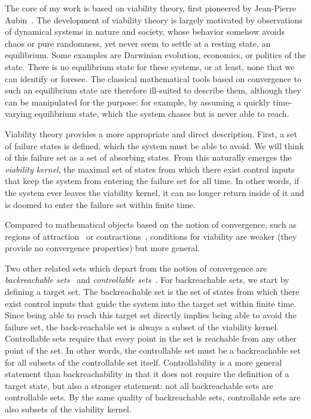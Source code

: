 The core of my work is based on viability theory, first pioneered by Jean-Pierre Aubin~\cite{aubin2011viability}. The development of viability theory is largely motivated by observations of dynamical systems in nature and society, whose behavior somehow avoids chaos or pure randomness, yet never seem to settle at a resting state, an equilibrium.
Some examples are Darwinian evolution, economics, or politics of the state. There is no equilibrium state for these systems, or at least, none that we can identify or foresee.
The classical mathematical tools based on convergence to such an equilibrium state are therefore ill-suited to describe them, although they can be manipulated for the purpose: for example, by assuming a quickly time-varying equilibrium state, which the system chases but is never able to reach. \par
Viability theory provides a more appropriate and direct description. First, a set of failure states is defined, which the system must be able to avoid. We will think of this failure set as a set of absorbing states. From this naturally emerges the \emph{viability kernel}, the maximal set of states from which there exist control inputs that keep the system from entering the failure set for all time. In other words, if the system ever leaves the viability kernel, it can no longer return inside of it and is doomed to enter the failure set within finite time. \par
Compared to mathematical objects based on the notion of convergence, such as regions of attraction~\cite[(section 6.4)]{strogatz2018nonlinear} or contractions~\cite{bazzi2018stability}, conditions for viability are weaker (they provide no convergence properties) but more general. \par
Two other related sets which depart from the notion of convergence are \emph{backreachable sets}~\cite{bansal2017hamilton} and \emph{controllable sets}~\cite{zaytsev2018boundaries}. For backreachable sets, we start by defining a target set.
The backreachable set is the set of states from which there exist control inputs that guide the system into the target set within finite time.
Since being able to reach this target set directly implies being able to avoid the failure set, the back-reachable set is always a subset of the viability kernel.
Controllable sets require that every point in the set is reachable from any other point of the set. In other words, the controllable set must be a backreachable set for all subsets of the controllable set itself. Controllability is a more general statement than backreachability in that it does not require the definition of a target state, but also a stronger statement: not all backreachable sets are controllable sets. By the same quality of backreachable sets, controllable sets are also subsets of the viability kernel. \par
